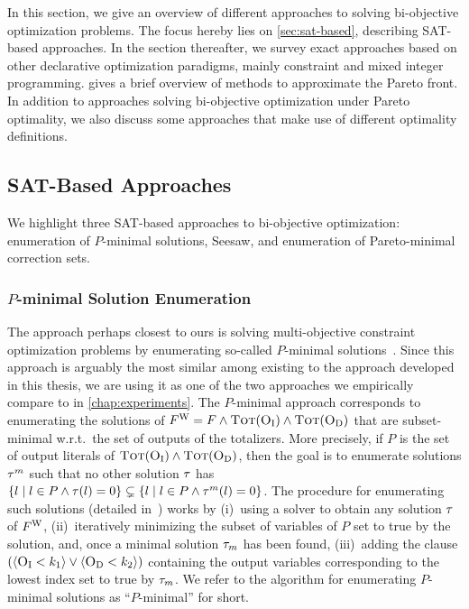 In this section, we give an overview of different approaches to solving bi-objective optimization problems.
The focus hereby lies on \cref{sec:sat-based}, describing SAT-based approaches.
In the section thereafter, we survey exact approaches based on other declarative optimization paradigms, mainly constraint and mixed integer programming.
 gives a brief overview of methods to approximate the Pareto front.
In addition to approaches solving bi-objective optimization under Pareto optimality, we also discuss some approaches that make use of different optimality definitions.

\subsection{SAT-Based Approaches\label{sec:sat-based}}

We highlight three SAT-based approaches to bi-objective optimization:
enumeration of $P$-minimal solutions, Seesaw, and enumeration of Pareto-minimal correction sets.

\subsubsection{$P$-minimal Solution Enumeration\label{sec:p-minimal}}


The approach perhaps closest to ours is solving multi-objective constraint optimization problems by enumerating so-called $P$-minimal solutions~\autocites{DBLP:conf/cp/SohBTB17,DBLP:conf/ftp/KoshimuraNFH09}.
Since this approach is arguably the most similar among existing to the approach developed in this thesis, we are using it as one of the two approaches we empirically compare \algname{} to in \cref{chap:experiments}.
The $P$-minimal approach  corresponds to enumerating the solutions of $F^\text{W} = F \land \textsc{Tot}(\textsc{O}_{\text{I}}) \land \textsc{Tot}(\textsc{O}_{\text{D}})$ that are subset-minimal w.r.t.\ the set of outputs of the totalizers.
More precisely, if $P$ is the set of output literals of $\textsc{Tot}(\textsc{O}_{\text{I}}) \land \textsc{Tot}(\textsc{O}_{\text{D}})$, then the goal is to enumerate solutions $\tau^m$ such that no other solution $\tau$ has $\{ l \mid l \in P \land \tau(l) = 0\} \subsetneq \{ l \mid l \in P \land \tau^m(l) = 0\}$.
The procedure for enumerating such solutions (detailed in~\textcite{DBLP:conf/ftp/KoshimuraNFH09}) works by (i)~using a solver to obtain any solution $\tau$ of $F^\text{W}$, (ii)~iteratively minimizing the subset of variables of $P$ set to true by the solution, and, once a minimal solution $\tau_m$ has been found, (iii)~adding the clause $(\langle \textsc{O}_{\text{I}} < k_1 \rangle \lor \langle \textsc{O}_{\text{D}} < k_2 \rangle)$ containing the output variables corresponding to the lowest index set to true by $\tau_m$.
We refer to the algorithm for enumerating $P$-minimal solutions as ``$P$-minimal'' for short.

